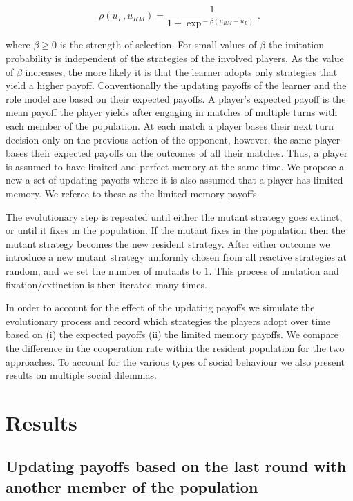 \documentclass[11pt]{article}
\theoremstyle{plainCl1}
\theoremstyle{plainCl2}
\begin{document}
\begin{equation} \label{Eq:rho}
  \rho(u_{L}, u_{RM}) = \frac{1}{1\!+\! \exp^{\!-\!\beta (u_{RM}\!-\!u_{L})}}.
\end{equation}

where $\beta\!\ge\!0$ is the strength of selection. For small values of $\beta$
the imitation probability is independent of the strategies of the involved
players. As the value of $\beta$ increases, the more likely it is that the
learner adopts only strategies that yield a higher payoff. Conventionally the
updating payoffs of the learner and the role model are based on their expected
payoffs. A player's expected payoff is the mean payoff the player yields after
engaging in matches of multiple turns with each member of the population. At
each match a player bases their next turn decision only on the previous action
of the opponent, however, the same player bases their expected payoffs on the
outcomes of all their matches. Thus, a player is assumed to have limited and
perfect memory at the same time. We propose a new a set of updating payoffs
where it is also assumed that a player has limited memory. We referee to these
as the limited memory payoffs.

The evolutionary step is repeated until either the mutant strategy goes extinct,
or until it fixes in the population. If the mutant fixes in the population then
the mutant strategy becomes the new resident strategy. After either outcome we
introduce a new mutant strategy uniformly chosen from all reactive strategies at
random, and we set the number of mutants to $1$. This process of mutation and
fixation/extinction is then iterated many times.

In order to account for the effect of the updating payoffs we simulate the
evolutionary process and record which strategies the players adopt over time
based on (i) the expected payoffs (ii) the limited memory payoffs. We compare
the difference in the cooperation rate within the resident population for the
two approaches. To account for the various types of social behaviour we also
present results on multiple social dilemmas.


\section{Results}\label{section:results} \subsection{Updating payoffs based on
the last round with another member of the population}\label{section:donation}
\end{document}
